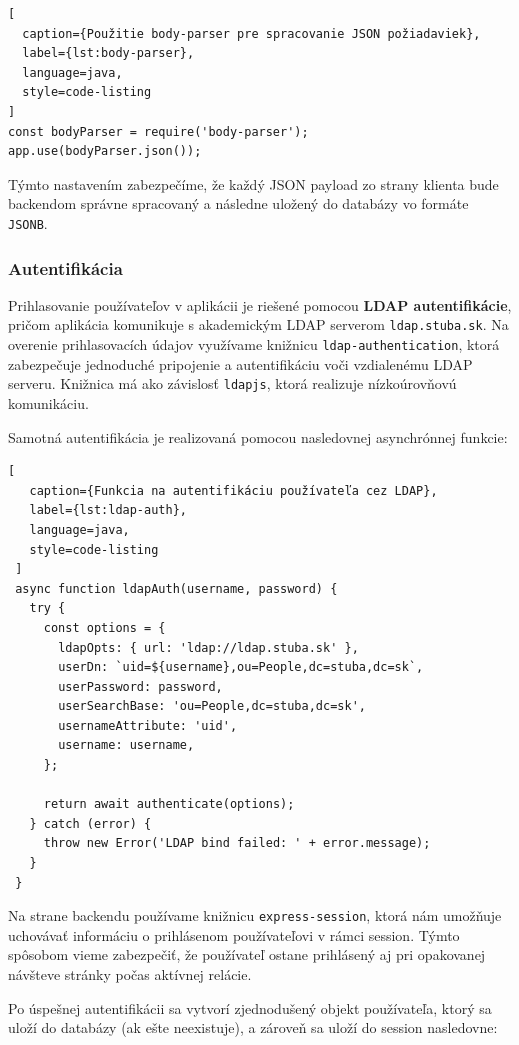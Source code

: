 \begin{lstlisting}[
  caption={Použitie body-parser pre spracovanie JSON požiadaviek},
  label={lst:body-parser},
  language=java,
  style=code-listing
]
const bodyParser = require('body-parser');
app.use(bodyParser.json());
\end{lstlisting}

Týmto nastavením zabezpečíme, že každý JSON payload zo strany klienta bude backendom správne spracovaný a následne uložený do databázy vo formáte \texttt{JSONB}.


 \subsubsection{Autentifikácia}

 Prihlasovanie používateľov v aplikácii je riešené pomocou \textbf{LDAP autentifikácie}, pričom aplikácia komunikuje s akademickým LDAP serverom \texttt{ldap.stuba.sk}. Na overenie prihlasovacích údajov využívame knižnicu \texttt{ldap-authentication}, ktorá zabezpečuje jednoduché pripojenie a autentifikáciu voči vzdialenému LDAP serveru. Knižnica má ako závislosť \texttt{ldapjs}, ktorá realizuje nízkoúrovňovú komunikáciu.
 
 Samotná autentifikácia je realizovaná pomocou nasledovnej asynchrónnej funkcie:
 
 \begin{lstlisting}[
   caption={Funkcia na autentifikáciu používateľa cez LDAP},
   label={lst:ldap-auth},
   language=java,
   style=code-listing
 ]
 async function ldapAuth(username, password) {
   try {
     const options = {
       ldapOpts: { url: 'ldap://ldap.stuba.sk' },
       userDn: `uid=${username},ou=People,dc=stuba,dc=sk`,
       userPassword: password,
       userSearchBase: 'ou=People,dc=stuba,dc=sk',
       usernameAttribute: 'uid',
       username: username,
     };
 
     return await authenticate(options);
   } catch (error) {
     throw new Error('LDAP bind failed: ' + error.message);
   }
 }
 \end{lstlisting}
 
 Na strane backendu používame knižnicu \texttt{express-session}, ktorá nám umožňuje uchovávať informáciu o prihlásenom používateľovi v rámci session. Týmto spôsobom vieme zabezpečiť, že používateľ ostane prihlásený aj pri opakovanej návšteve stránky počas aktívnej relácie.
 
 Po úspešnej autentifikácii sa vytvorí zjednodušený objekt používateľa, ktorý sa uloží do databázy (ak ešte neexistuje), a zároveň sa uloží do session nasledovne:
 
